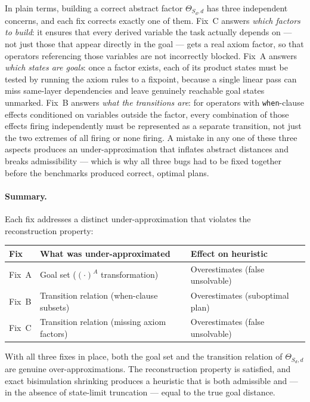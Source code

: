 \documentclass[11pt,a4paper]{article}
\begin{document}
In plain terms, building a correct abstract factor $\Theta_{S_d,d}$ has
three independent concerns, and each fix corrects exactly one of them.
Fix~C answers \emph{which factors to build}: it ensures that every derived
variable the task actually depends on --- not just those that appear
directly in the goal --- gets a real axiom factor, so that operators
referencing those variables are not incorrectly blocked.  Fix~A answers
\emph{which states are goals}: once a factor exists, each of its product
states must be tested by running the axiom rules to a fixpoint, because a
single linear pass can miss same-layer dependencies and leave genuinely
reachable goal states unmarked.  Fix~B answers \emph{what the transitions
are}: for operators with \texttt{when}-clause effects conditioned on
variables outside the factor, every combination of those effects firing
independently must be represented as a separate transition, not just the
two extremes of all firing or none firing.  A mistake in any one of these
three aspects produces an under-approximation that inflates abstract
distances and breaks admissibility --- which is why all three bugs had to
be fixed together before the benchmarks produced correct, optimal plans.

\paragraph{Summary.}

Each fix addresses a distinct under-approximation that violates the
reconstruction property:

\begin{center}
\begin{tabular}{lll}
\toprule
\textbf{Fix} & \textbf{What was under-approximated} & \textbf{Effect on heuristic} \\
\midrule
Fix~A & Goal set ($(\cdot)^A$ transformation) & Overestimates (false unsolvable) \\
Fix~B & Transition relation (when-clause subsets) & Overestimates (suboptimal plan) \\
Fix~C & Transition relation (missing axiom factors) & Overestimates (false unsolvable) \\
\bottomrule
\end{tabular}
\end{center}

With all three fixes in place, both the goal set and the transition
relation of $\Theta_{S_d,d}$ are genuine over-approximations.  The
reconstruction property is satisfied, and exact bisimulation shrinking
produces a heuristic that is both admissible and --- in the absence of
state-limit truncation --- equal to the true goal distance.
\end{document}
